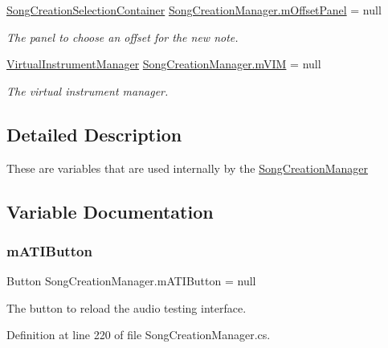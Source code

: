 \begin{DoxyCompactItemize}
\hyperlink{group___s_c_m_nest_class_class_song_creation_manager_1_1_song_creation_selection_container}{Song\+Creation\+Selection\+Container} \hyperlink{group___s_c_m_priv_var_ga86a44007a4b127d7aa61f75dd34a3409}{Song\+Creation\+Manager.\+m\+Offset\+Panel} = null
\begin{DoxyCompactList}\small\item\em The panel to choose an offset for the new note. \end{DoxyCompactList}\item 
\hyperlink{class_virtual_instrument_manager}{Virtual\+Instrument\+Manager} \hyperlink{group___s_c_m_priv_var_ga7822ac42d20a4577db66808f000decfb}{Song\+Creation\+Manager.\+m\+V\+IM} = null
\begin{DoxyCompactList}\small\item\em The virtual instrument manager. \end{DoxyCompactList}\end{DoxyCompactItemize}


\subsection{Detailed Description}
These are variables that are used internally by the \hyperlink{class_song_creation_manager}{Song\+Creation\+Manager} 

\subsection{Variable Documentation}
\mbox{\label{group___s_c_m_priv_var_gae702ec5de2c75149b8c650db9ac260a6}} 
\subsubsection{\texorpdfstring{m\+A\+T\+I\+Button}{mATIButton}}
{\footnotesize\ttfamily Button Song\+Creation\+Manager.\+m\+A\+T\+I\+Button = null\hspace{0.3cm}{\ttfamily [private]}}



The button to reload the audio testing interface. 



Definition at line 220 of file Song\+Creation\+Manager.\+cs.

